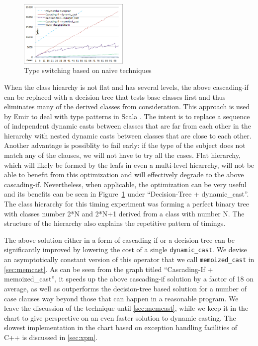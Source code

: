 \documentclass[preprint]{sigplanconf}
\makeatletter
\DeclareRobustCommand{\code}[1]{{\lstinline[breaklines=false,escapechar=@]{#1}}}
\makeatother
\begin{document}
\begin{figure}[htbp]
  \centering
    \includegraphics[width=0.47\textwidth]{DCast-vs-Visitors1.png}
  \caption{Type switching based on naive techniques}
  \label{fig:DCastVis1}
\end{figure}

When the class hiearchy is not flat and has several levels, the above 
cascading-if can be replaced with a decision tree that tests base classes first 
and thus eliminates many of the derived classes from consideration. This 
approach is used by Emir to deal with type patterns in Scala
\cite[]{EmirThesis}. The intent is to replace a sequence of 
independent dynamic casts between classes that are far from each other in the 
hierarchy with nested dynamic casts between classes that are close to each 
other. Another advantage is possiblity to fail early: if the type of the subject 
does not match any of the clauses, we will not have to try all the cases. 
Flat hierarchy, which will likely be formed by the leafs in even a multi-level 
hiearrchy, will not be able to benefit from this optimization and 
will effectively degrade to the above cascading-if. Nevertheless, when 
applicable, the optimization can be very useful and its benefits can be seen in
Figure~\ref{fig:DCastVis1} under ``Decision-Tree + dynamic\_cast''. The class 
hierarchy for this timing experiment was forming a perfect binary tree with 
classes number 2*N and 2*N+1 derived from a class with number N. The structure 
of the hierarchy also explains the repetitive pattern of timings.

The above solution either in a form of cascading-if or a decision tree can be 
significantly improved by lowering the cost of a single \code{dynamic_cast}. 
We devise an asymptotically constant version of this operator that we call
\code{memoized_cast} in \textsection\ref{sec:memcast}. As can be seen from the graph 
titled ``Cascading-If + memoized\_cast'', it speeds up the above cascading-if 
solution by a factor of 18 on average, as well as outperforms the decision-tree 
based solution for a number of case clauses way beyond those that can happen in 
a reasonable program. We leave the discussion of the technique until 
\textsection\ref{sec:memcast}, while we keep it in the chart to give perspective on 
an even faster solution to dynamic casting. The slowest implementation in the 
chart based on exception handling facilities of C++ is discussed in 
\textsection\ref{sec:xpm}.
\end{document}
